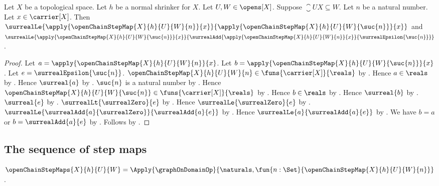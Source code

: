 \begin{corollary}\label{open_chain_step_map_successor_bounds}
    Let $X$ be a topological space.
    Let $h$ be a normal shrinker for $X$.
    Let $U,W\in\opens[X]$.
    Suppose $\closure{U}{X}\subseteq W$.
    Let $n$ be a natural number.
    Let $x\in\carrier[X]$.
    Then
        $\surrealLe{
            \apply{\openChainStepMap{X}{h}{U}{W}{n}}{x}}
            {\apply{\openChainStepMap{X}{h}{U}{W}{\suc{n}}}{x}}$ and
        $\surrealLe{
            \apply{\openChainStepMap{X}{h}{U}{W}{\suc{n}}}{x}}
            {\surrealAdd{
                \apply{\openChainStepMap{X}{h}{U}{W}{n}}{x}}
                {\surrealEpsilon{\suc{n}}}}$.
\end{corollary}
\begin{proof}
    Let $a=\apply{\openChainStepMap{X}{h}{U}{W}{n}}{x}$.
    Let $b=\apply{\openChainStepMap{X}{h}{U}{W}{\suc{n}}}{x}$.
    Let $e=\surrealEpsilon{\suc{n}}$.
    $\openChainStepMap{X}{h}{U}{W}{n}
        \in\funs{\carrier[X]}{\reals}$
        by .
    Hence $a\in\reals$ by .
    Hence $\surreal{a}$ by .
    $\suc{n}$ is a natural number by .
    Hence $\openChainStepMap{X}{h}{U}{W}{\suc{n}}
        \in\funs{\carrier[X]}{\reals}$
        by .
    Hence $b\in\reals$ by .
    Hence $\surreal{b}$ by .
    $\surreal{e}$ by .
    $\surrealLt{\surrealZero}{e}$
        by .
    Hence $\surrealLe{\surrealZero}{e}$ by .
    $\surrealLe{\surrealAdd{a}{\surrealZero}}{\surrealAdd{a}{e}}$
        by .
    Hence $\surrealLe{a}{\surrealAdd{a}{e}}$
        by .
    We have $b=a$ or $b=\surrealAdd{a}{e}$
        by .
    Follows by .
\end{proof}

\subsection{The sequence of step maps}

\begin{definition}\label{open_chain_step_maps}
    $\openChainStepMaps{X}{h}{U}{W}
        =\Apply{\graphOnDomainOp}
            {\naturals,\fun{n:\Set}{\openChainStepMap{X}{h}{U}{W}{n}}}$.
\end{definition}

